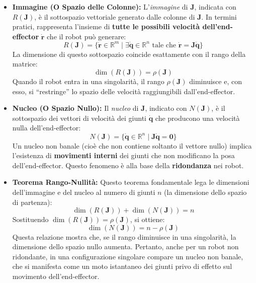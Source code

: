 \documentclass[11pt, a4paper]{report}
\begin{document}
\begin{itemize}
    \item \textbf{Immagine (O Spazio delle Colonne):} L'\textit{immagine} di \(\bm{J}\), indicata con $R(\bm{J})$, è il sottospazio vettoriale generato dalle colonne di \(\bm{J}\). In termini pratici, rappresenta l'insieme di \textbf{tutte le possibili velocità dell'end-effector} \(\bm{\dot{r}}\) che il robot può generare:
    \[
        R(\bm{J}) = \{\bm{\dot{r}} \in \mathbb{R}^{m} \mid \exists \dot{\bm{q}} \in \mathbb{R}^{n} \text{ tale che } \bm{\dot{r}} = \bm{J}\dot{\bm{q}}\}
    \]
    La dimensione di questo sottospazio coincide esattamente con il rango della matrice:
    \[
        \dim(R(\bm{J})) = \rho(\bm{J})
    \]
    Quando il robot entra in una singolarità, il rango \(\rho(\bm{J})\) diminuisce e, con esso, si ``restringe'' lo spazio delle velocità raggiungibili dall'end-effector.

    \item \textbf{Nucleo (O Spazio Nullo):} Il \textit{nucleo} di \(\bm{J}\), indicato con $N(\bm{J})$, è il sottospazio dei vettori di velocità dei giunti \(\dot{\bm{q}}\) che producono una velocità nulla dell'end-effector:
    \[
        N(\bm{J}) = \{\dot{\bm{q}} \in \mathbb{R}^{n} \mid \bm{J}\dot{\bm{q}} = \bm{0}\}
    \]
    Un nucleo non banale (cioè che non contiene soltanto il vettore nullo) implica l'esistenza di \textbf{movimenti interni} dei giunti che non modificano la posa dell'end-effector. Questo fenomeno è alla base della \textbf{ridondanza} nei robot.
    \newpage
    \item \textbf{Teorema Rango-Nullità:} Questo teorema fondamentale lega le dimensioni dell'immagine e del nucleo al numero di giunti \(n\) (la dimensione dello spazio di partenza):
    \[
        \dim(R(\bm{J})) + \dim(N(\bm{J})) = n
    \]
    Sostituendo $\dim(R(\bm{J})) = \rho(\bm{J})$, si ottiene:
    \[
        \dim(N(\bm{J})) = n - \rho(\bm{J})
    \]
    Questa relazione mostra che, se il rango diminuisce in una singolarità, la dimensione dello spazio nullo aumenta. Pertanto, anche per un robot non ridondante, in una configurazione singolare compare un nucleo non banale, che si manifesta come un moto istantaneo dei giunti privo di effetto sul movimento dell'end-effector.


\end{itemize}
\end{document}
